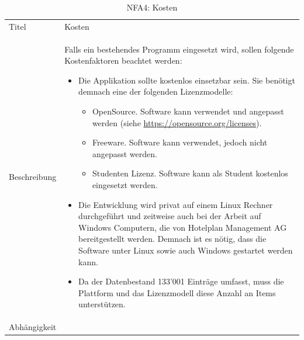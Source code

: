  \begin{table}[H] 
	\caption{NFA4: Kosten}
	\centering
	\label{fig:anforderungsanalyse:nichtfunktionaleanforderung:nfa4}
	\begin{tabular}{ | l | L{10cm} | } 
		\hline 
		 \\ \hline 
		Titel & Kosten \\ \hline 
		Beschreibung & Falls ein bestehendes Programm eingesetzt wird, sollen folgende Kostenfaktoren beachtet werden: 
		\begin{itemize}
		\item Die Applikation sollte kostenlos einsetzbar sein. Sie benötigt demnach eine der folgenden Lizenzmodelle:
		\begin{itemize}
		\item OpenSource. Software kann verwendet und angepasst werden (siehe \url{https://opensource.org/licenses}).
		\item Freeware. Software kann verwendet, jedoch nicht angepasst werden.
		\item Studenten Lizenz. Software kann als Student kostenlos eingesetzt werden.
		\end{itemize}
		\item Die Entwicklung wird privat auf einem Linux Rechner durchgeführt und zeitweise auch bei der Arbeit auf Windows Computern, die von Hotelplan Management AG bereitgestellt werden.
		Demnach ist es nötig, dass die Software unter Linux sowie auch Windows gestartet werden kann.
		\item Da der Datenbestand 133'001 Einträge umfasst, muss die Plattform und das Lizenzmodell diese Anzahl an Items unterstützen.
		\end{itemize}\\ \hline 
		Abhängigkeit & \\ \hline 
	\end{tabular}
\end{table}

